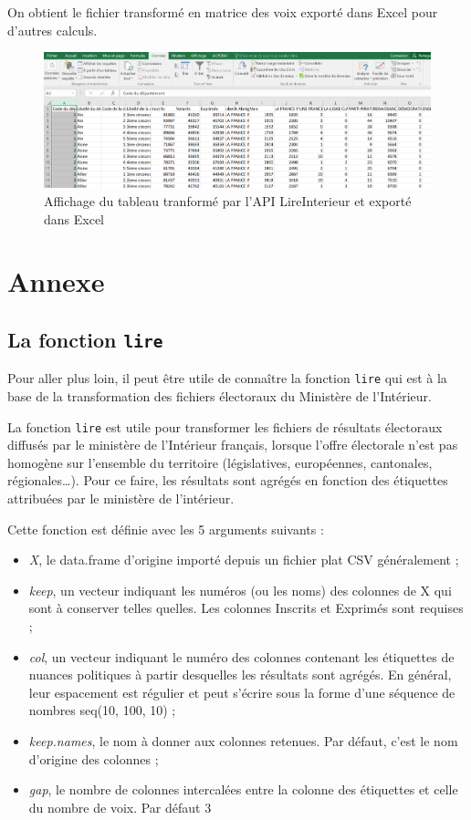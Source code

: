 \documentclass[
]{article}
\providecommand{\tightlist}{%
  \setlength{\itemsep}{0pt}\setlength{\parskip}{0pt}}
\begin{document}
On obtient le fichier transformé en matrice des voix exporté dans Excel
pour d'autres calculs.

\begin{figure}
\centering
\includegraphics{fig/tableau_matrice_des_voix.PNG}
\caption{Affichage du tableau tranformé par l'API LireInterieur et
exporté dans Excel}
\end{figure}

\hypertarget{annexe}{%
\section{Annexe}\label{annexe}}

\hypertarget{la-fonction-lire}{%
\subsection{\texorpdfstring{La fonction
\texttt{lire}}{La fonction lire}}\label{la-fonction-lire}}

Pour aller plus loin, il peut être utile de connaître la fonction
\texttt{lire} qui est à la base de la transformation des fichiers
électoraux du Ministère de l'Intérieur.

La fonction \texttt{lire} est utile pour transformer les fichiers de
résultats électoraux diffusés par le ministère de l'Intérieur français,
lorsque l'offre électorale n'est pas homogène sur l'ensemble du
territoire (législatives, européennes, cantonales, régionales\ldots).
Pour ce faire, les résultats sont agrégés en fonction des étiquettes
attribuées par le ministère de l'intérieur.

Cette fonction est définie avec les 5 arguments suivants :

\begin{itemize}
\tightlist
\item
  \emph{X}, le data.frame d'origine importé depuis un fichier plat CSV
  généralement ;
\item
  \emph{keep}, un vecteur indiquant les numéros (ou les noms) des
  colonnes de X qui sont à conserver telles quelles. Les colonnes
  Inscrits et Exprimés sont requises ;
\item
  \emph{col}, un vecteur indiquant le numéro des colonnes contenant les
  étiquettes de nuances politiques à partir desquelles les résultats
  sont agrégés. En général, leur espacement est régulier et peut
  s'écrire sous la forme d'une séquence de nombres seq(10, 100, 10) ;
\item
  \emph{keep.names}, le nom à donner aux colonnes retenues. Par défaut,
  c'est le nom d'origine des colonnes ;
\item
  \emph{gap}, le nombre de colonnes intercalées entre la colonne des
  étiquettes et celle du nombre de voix. Par défaut 3
\end{itemize}
\end{document}
